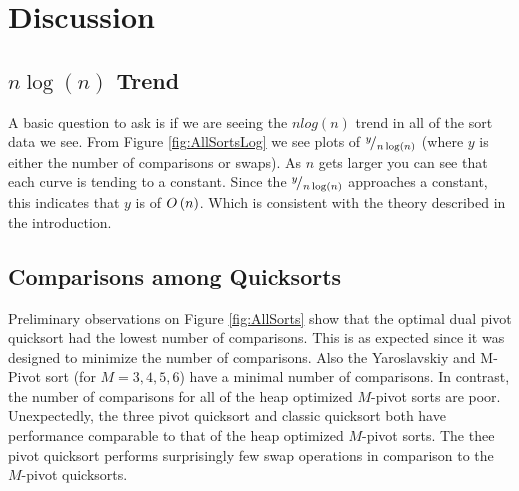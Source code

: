 		

\section{Discussion}
	\label{sec:Discussion}
	\subsection{$n\log(n)$ Trend}
		
		A basic question to ask is if we are seeing the $n log(n)$ trend in all of the sort data we see. From Figure \ref{fig:AllSortsLog} we see plots of ${}^{y}\!/_{n \log(n)}$ (where $y$ is either the number of comparisons or swaps). As $n$ gets larger you can see that each curve is tending to a constant. Since the ${}^{y}\!/_{n \log(n)}$ approaches a constant, this indicates that $y$ is of $O\left(n\right)$. Which is consistent with the theory described in the introduction.
		

	\subsection{Comparisons among Quicksorts}
	
		Preliminary observations on Figure \ref{fig:AllSorts} show that the optimal dual pivot quicksort had the lowest number of comparisons. This is as expected since it was designed to minimize the number of comparisons. Also the Yaroslavskiy and M-Pivot sort (for $M=3,4,5,6$) have a minimal number of comparisons. In contrast, the number of comparisons for all of the heap optimized $M$-pivot sorts are poor. Unexpectedly, the three pivot quicksort and classic quicksort both have performance comparable to that of the heap optimized $M$-pivot sorts. The thee pivot quicksort performs surprisingly few swap operations in comparison to the $M$-pivot quicksorts. 
		
